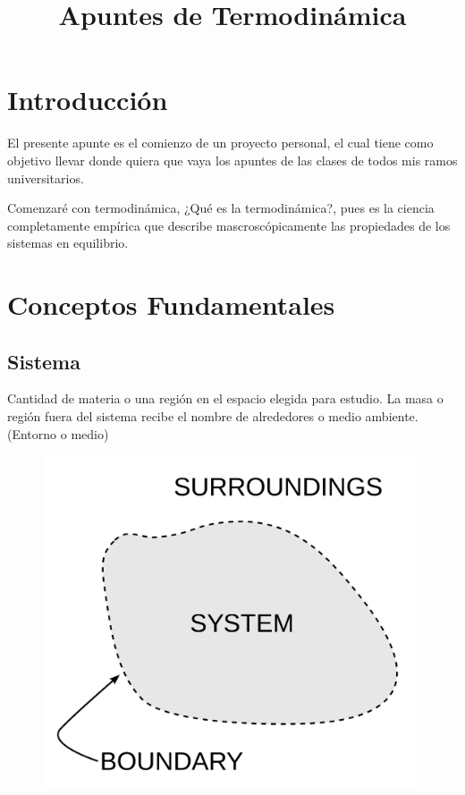 \documentclass[12pt,twocolumn,a4paper]{report}
\title{Apuntes de Termodinámica}
\date{}
\begin{document}
\maketitle

\newpage
\tableofcontents

\onecolumn
\chapter*{Introducción}
El presente apunte es el comienzo de un proyecto personal, el cual tiene como objetivo llevar donde quiera que vaya los apuntes de las clases de todos mis ramos universitarios. 

Comenzaré con termodinámica, ¿Qué es la termodinámica?, pues es la ciencia completamente empírica que describe mascroscópicamente las propiedades de los sistemas en equilibrio. 

\twocolumn
\newpage


\chapter*{Conceptos Fundamentales}
	\section*{Sistema}
Cantidad de materia o una región en el espacio elegida para estudio. La masa o región fuera del sistema recibe el nombre de alrededores o medio ambiente. (Entorno o medio)
\begin{figure}[H]
\centering
\includegraphics[scale=0.05]{graficos/sistema1.jpeg}
\end{figure}
\end{document}
